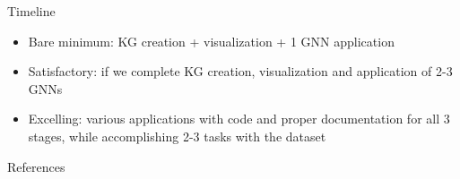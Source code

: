 \documentclass{beamer}
\begin{document}
\begin{frame}{Timeline}
    \begin{itemize}
        \item Bare minimum: KG creation + visualization + 1 GNN application
        \item Satisfactory: if we complete KG creation, visualization and application of 2-3 GNNs 
        \item Excelling: various applications with code and proper documentation for all 3 stages, while accomplishing 2-3 tasks with the dataset
    \end{itemize}
\end{frame}

\begin{frame}{References}
    \printbibliography
\end{frame}
\end{document}
